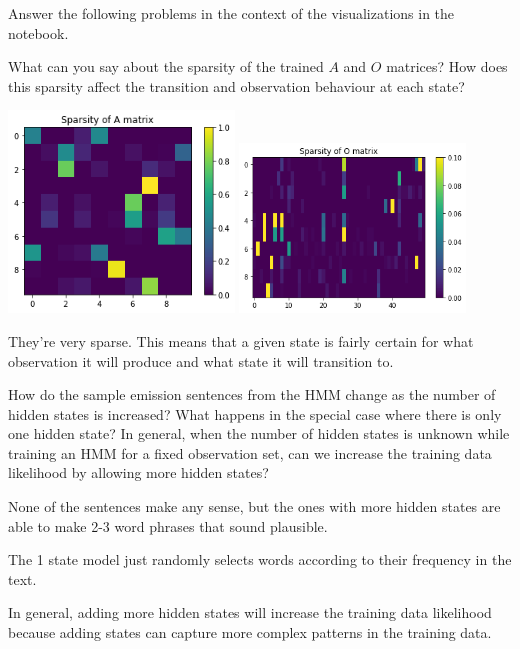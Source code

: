 Answer the following problems in the context of the visualizations in the notebook.

\indent\problem[3] %
What can you say about the sparsity of the trained $A$ and $O$ matrices? How does this sparsity affect the transition and observation behaviour at each state?
\begin{solution}
  
  \includegraphics[width=0.45\textwidth]{images/sparsity_a.png}
  \includegraphics[width=0.45\textwidth]{images/sparsity_o.png}

  They're very sparse.
  This means that a given state is fairly certain for what observation it will produce and what state it will transition to.
\end{solution}

\indent\problem[5] %
How do the sample emission sentences from the HMM change as the number of hidden states is increased? What happens in the special case where there is only one hidden state? In general, when the number of hidden states is unknown while training an HMM for a fixed observation set, can we increase the training data likelihood by allowing more hidden states?

\begin{solution}
  None of the sentences make any sense, but the ones with more hidden states are able to make 2-3 word phrases that sound plausible.

  The 1 state model just randomly selects words according to their frequency in the text.

  In general, adding more hidden states will increase the training data likelihood because adding states can capture more complex patterns in the training data.
\end{solution}


